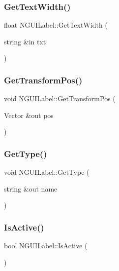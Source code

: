 \subsubsection{\texorpdfstring{Get\+Text\+Width()}{GetTextWidth()}}
{\footnotesize\ttfamily float N\+G\+U\+I\+Label\+::\+Get\+Text\+Width (\begin{DoxyParamCaption}\item[{string \&in}]{txt }\end{DoxyParamCaption})}

\hypertarget{class_n_g_u_i_label_ab536a31c871fa87a04afe15e1cc553c3}{}\label{class_n_g_u_i_label_ab536a31c871fa87a04afe15e1cc553c3} 
\subsubsection{\texorpdfstring{Get\+Transform\+Pos()}{GetTransformPos()}}
{\footnotesize\ttfamily void N\+G\+U\+I\+Label\+::\+Get\+Transform\+Pos (\begin{DoxyParamCaption}\item[{Vector \&out}]{pos }\end{DoxyParamCaption})}

\hypertarget{class_n_g_u_i_label_a999a7dd036dc64027a3be5bb79665baf}{}\label{class_n_g_u_i_label_a999a7dd036dc64027a3be5bb79665baf} 
\subsubsection{\texorpdfstring{Get\+Type()}{GetType()}}
{\footnotesize\ttfamily void N\+G\+U\+I\+Label\+::\+Get\+Type (\begin{DoxyParamCaption}\item[{string \&out}]{name }\end{DoxyParamCaption})}

\hypertarget{class_n_g_u_i_label_a3034e3b5322b4128adeb4c4d6453ce2b}{}\label{class_n_g_u_i_label_a3034e3b5322b4128adeb4c4d6453ce2b} 
\subsubsection{\texorpdfstring{Is\+Active()}{IsActive()}}
{\footnotesize\ttfamily bool N\+G\+U\+I\+Label\+::\+Is\+Active (\begin{DoxyParamCaption}{ }\end{DoxyParamCaption})}

